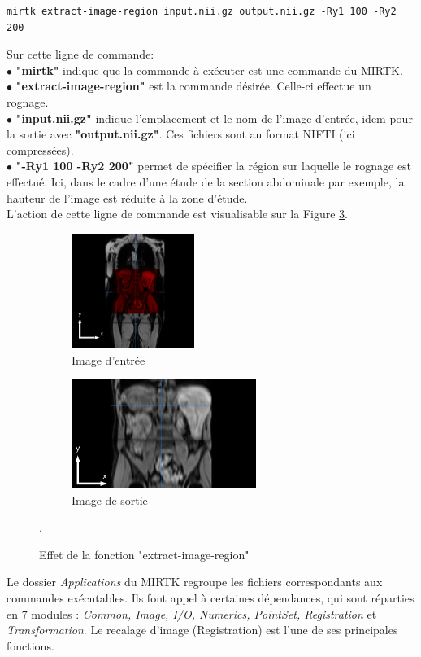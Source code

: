 \documentclass[10pt]{report}
\begin{document}
	\begin{lstlisting}
mirtk extract-image-region input.nii.gz output.nii.gz -Ry1 100 -Ry2 200
	\end{lstlisting}
	
	\noindent Sur cette ligne de commande:\\
	\t{$\bullet$} \textbf{"mirtk"} indique que la commande à exécuter est une commande du MIRTK.\\
	\t{$\bullet$} \textbf{"extract-image-region"} est la commande désirée. Celle-ci effectue un rognage.\\
	\t{$\bullet$} \textbf{"input.nii.gz"} indique l'emplacement et le nom de l'image d'entrée, idem pour la sortie avec \textbf{"output.nii.gz"}. Ces fichiers sont au format NIFTI (ici compressées).\\
	\t{$\bullet$} \textbf{"-Ry1 100 -Ry2 200"} permet de spécifier la région sur laquelle le rognage est effectué. Ici, dans le cadre d'une étude de la section abdominale par exemple, la hauteur de l'image est réduite à la zone d'étude. 
	\\L'action de cette ligne de commande est visualisable sur la Figure \ref{Effet de la fonction "extract-image-region"}.
	
	\begin{figure}[h!]
		\centering
		\begin{subfigure}{.5\textwidth}
			\centering
			\includegraphics[width=4cm]{Reports/figures/mirtkextractregion1dbis.png}
			\caption{Image d'entrée}
			\label{Image d'entrée}
		\end{subfigure}%
		\begin{subfigure}{.5\textwidth}
			\centering
			\includegraphics[width=6cm]{Reports/figures/mirtkextractregion21d.png}
			\caption{Image de sortie}
			\label{Image de sortie}
		\end{subfigure}
		\caption{Effet de la fonction "extract-image-region"}.
		\label{Effet de la fonction "extract-image-region"}
	\end{figure}	
	\vspace{-0.5cm}
	Le dossier \textit{Applications} du MIRTK regroupe les fichiers correspondants aux commandes exécutables. Ils font appel à certaines dépendances, qui sont réparties en 7 modules : \textit{Common, Image, I/O, Numerics, PointSet, Registration} et \textit{Transformation}. 
	 Le recalage d'image (Registration) est l'une de ses principales fonctions.
	
\end{document}
